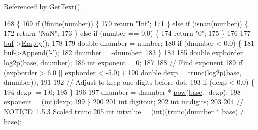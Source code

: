Referenced by Get\+Text().


\begin{DoxyCode}
168 \{
169     \textcolor{keywordflow}{if} (!\hyperlink{math_8h_a08e754462e6ec13bc05fd41cff9cdd4a}{finite}(number)) \{
170         \textcolor{keywordflow}{return} \textcolor{stringliteral}{"Inf"};
171     \} \textcolor{keywordflow}{else} \textcolor{keywordflow}{if} (\hyperlink{math_8h_afdf433fdb158cbe82ce818a3a2de736b}{isnan}(number)) \{
172         \textcolor{keywordflow}{return} \textcolor{stringliteral}{"NaN"};
173     \} \textcolor{keywordflow}{else} \textcolor{keywordflow}{if} (number == 0.0) \{
174         \textcolor{keywordflow}{return} \textcolor{stringliteral}{"0"};
175     \}
176 
177     \hyperlink{classNumeralSystem_a03e7be944bf3fa5e4c34d80f135cd017}{buf}->\hyperlink{classCharBuffer_abe39d3fd7d8b9c8ec343af2cae7adc96}{Empty}();
178 
179     \textcolor{keywordtype}{double} dnumber = number;
180     \textcolor{keywordflow}{if} (dnumber < 0.0) \{
181         \hyperlink{classNumeralSystem_a03e7be944bf3fa5e4c34d80f135cd017}{buf}->\hyperlink{classCharBuffer_a045b38735f7b3007c1b98d3d7b7feafe}{Append}(\textcolor{charliteral}{'-'});
182         dnumber = -dnumber;
183     \}
184 
185     \textcolor{keywordtype}{double} expborder = \hyperlink{math_8h_a2df129f972d9b1faeabee4d7aeb1b439}{log2p}(\hyperlink{classPositionalNumeralSystem_a50cd19222978e16cc9c8b481c72c4662}{base}, dnumber);
186     \textcolor{keywordtype}{int} exponent = 0;
187 
188     \textcolor{comment}{// Find exponent}
189     \textcolor{keywordflow}{if} (expborder > 6.0 || expborder < -5.0) \{
190         \textcolor{keywordtype}{double} dexp = \hyperlink{math_8h_a82a151adfde56b28fa8a50355c4f2ff6}{trunc}(\hyperlink{math_8h_a2df129f972d9b1faeabee4d7aeb1b439}{log2p}(\hyperlink{classPositionalNumeralSystem_a50cd19222978e16cc9c8b481c72c4662}{base}, dnumber));
191 
192         \textcolor{comment}{// Adjust to keep one digits before dot.}
193         \textcolor{keywordflow}{if} (dexp < 0.0) \{
194             dexp -= 1.0;
195         \}
196 
197         dnumber = dnumber * \hyperlink{math_8h_aa56c9494c95edf68386375e97d64159b}{pow}(\hyperlink{classPositionalNumeralSystem_a50cd19222978e16cc9c8b481c72c4662}{base}, -dexp);
198         exponent = (int)dexp;
199     \}
200 
201     \textcolor{keywordtype}{int} digitout;
202     \textcolor{keywordtype}{int} intdigits;
203 
204     \textcolor{comment}{// NOTICE: 1.5.3 Scaled trunc}
205     \textcolor{keywordtype}{int} intvalue = (int)(\hyperlink{math_8h_a82a151adfde56b28fa8a50355c4f2ff6}{trunc}(dnumber * \hyperlink{classPositionalNumeralSystem_a50cd19222978e16cc9c8b481c72c4662}{base}) / \hyperlink{classPositionalNumeralSystem_a50cd19222978e16cc9c8b481c72c4662}{base});

\end{DoxyCode}
